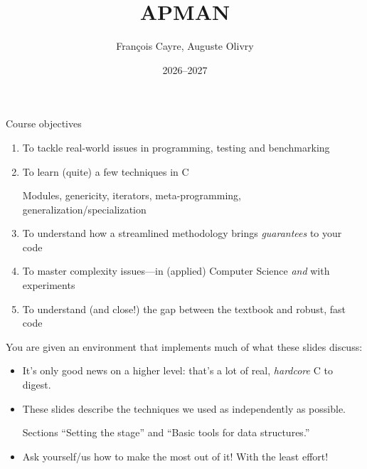 \documentclass[aspectratio=169,11pt]{beamer}
\title{{APMAN}}
\author{Fran\c cois Cayre, Auguste Olivry}
\institute{Phelma / 2A {SEOC}}
\date{2026--2027}
\begin{document}
\begin{frame}
    \titlepage
\end{frame}


\begin{frame}[fragile]{Course objectives}

  \begin{enumerate}
  \item To tackle real-world issues in programming, testing and benchmarking
  \item To learn (quite) a few techniques in C

    Modules, genericity, iterators, meta-programming, generalization/specialization
  \item To understand how a streamlined methodology brings {\em guarantees} to your code
  \item To master complexity issues---in (applied) Computer Science {\em and} with experiments
  \item To understand (and close!) the gap between the textbook and robust, fast code
  \end{enumerate}

  You are given an environment that implements much of what these slides discuss:
  \begin{itemize}
  \item It's only good news on a higher level: that's a lot of real, {\em hardcore} C to digest.
  \item These slides describe the techniques we used as independently as possible.

    Sections ``Setting the stage'' and ``Basic tools for data structures.''
  \item Ask yourself/us how to make the most out of it! With the least effort!
  \end{itemize}
  
\end{frame}











\end{document}
